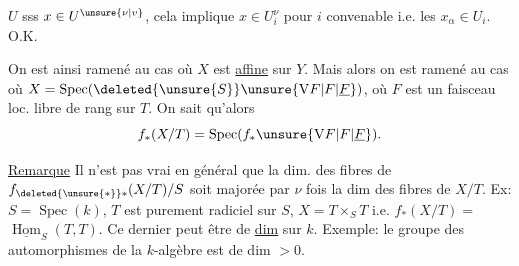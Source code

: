 $U$ sss $x\in U^{\unsure{\nu|v}}$,  cela implique
$x\in U_i^\nu$ pour $i$ convenable i.e. les $x_\alpha\in U_i$.
O.K.

On est ainsi ramené au cas où $X$
est \uline{affine} sur $Y$. Mais alors on est
\unsure{=} ramené au cas où $X=\operatorname{Spec}(\deleted{\unsure{S}}\unsure{\mathrm V F|F|\underline F})$, où
$F$ est un faisceau loc. libre de rang 
sur $T$. On sait qu'alors
\[
f_\ast(X/T)=\operatorname{Spec}(f_\ast \unsure{\mathrm V F|F|\underline F}).
\]


\uline{Remarque} Il n'est pas vrai en général que
la dim. des fibres de $f_{\deleted{\unsure{\ast}}\ast}(X/T)/S$
soit majorée par $\nu$ fois la dim
des fibres de  $X/T$. Ex:
$S=\operatorname{Spec}(k)$, $T$ est purement
radiciel sur $S$, $X=T\times_S T$ i.e. $f_\ast(X/T)=$
$\underline{\operatorname{Hom}}_S(T,T)$. Ce dernier peut être de
\uline{dim}  sur $k$. Exemple: le groupe des
automorphismes de la $k$-algèbre  est
de dim $>0$.
